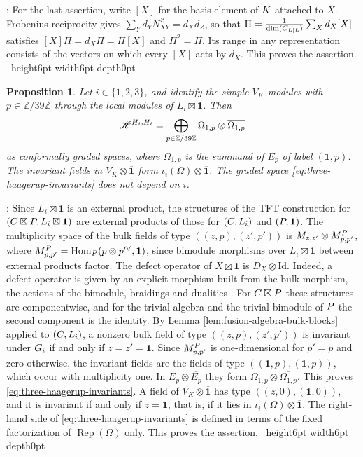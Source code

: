 \documentclass[leqno]{article}
\let\cal\relax
\newcommand{\cal}{\mathcal}
\newcommand{\Z}{\ensuremath{\mathbb{Z}}}
\newcommand{\Id}{\mathrm{Id}}
\newcommand{\qed}{\hfill \vrule height6pt  width6pt depth0pt}
\newcommand{\ot}{\otimes}
\DeclareMathOperator{\Rep}{Rep}
\newtheorem{prop}[thm]{Proposition}
\newenvironment{proof}[1][]{\noindent {\it Proof #1} : }{\hbox{~}\qed
\smallskip
}
\numberwithin{equation}{section}
\begin{document}
\begin{proof}
For the last assertion, write $[X]$ for the basis element of $\cal K$ attached to $X$. Frobenius reciprocity gives $\sum_Yd_YN_{XY}^Z = d_Xd_Z$, so that $\Pi = \frac1{\dim(\cal C_{\cal L|\cal L})}\sum_Xd_X[X]$ satisfies $[X]\Pi = d_X\Pi = \Pi[X]$ and $\Pi^2 = \Pi$. Its range in any representation consists of the vectors on which every $[X]$ acts by $d_X$. This proves the assertion.
\end{proof}

\begin{prop}
\label{prop:three-haagerup-invariant-spectra}
Let $i \in \{1,2,3\}$, and identify the simple $V_K$-modules with $p \in \Z/39\Z$ through the local modules of $L_i\boxtimes\mathbf1$. Then
\begin{equation}
\label{eq:three-haagerup-invariants}
\mathscr H^{\cal H_i,\cal H_i} = \bigoplus_{p \in \Z/39\Z}\Omega_{1,p}\ot\overline{\Omega_{1,p}}
\end{equation}
as conformally graded spaces, where $\Omega_{1,p}$ is the summand of $E_p$ of label $(\mathbf1,p)$. The invariant fields in $V_K\ot\overline{\mathbf1}$ form $\iota_i(\Omega)\ot\overline{\mathbf1}$. The graded space \eqref{eq:three-haagerup-invariants} does not depend on $i$.
\end{prop}

\begin{proof}
Since $L_i\boxtimes\mathbf1$ is an external product, the structures of the TFT construction for $(\cal C\boxtimes\cal P,L_i\boxtimes\mathbf1)$ are external products of those for $(\cal C,L_i)$ and $(\cal P,\mathbf1)$. The multiplicity space of the bulk fields of type $((z,p),(z',p'))$ is $M_{z,z'}\ot M^{\cal P}_{p,p'}$, where $M^{\cal P}_{p,p'} = \operatorname{Hom}_{\cal P}(p\ot p'^\vee,\mathbf1)$, since bimodule morphisms over $L_i\boxtimes\mathbf1$ between external products factor. The defect operator of $X\boxtimes\mathbf1$ is $D_X\ot\Id$. Indeed, a defect operator is given by an explicit morphism built from the bulk morphism, the actions of the bimodule, braidings and dualities \cite[equation (4.14)]{FFRS07}. For $\cal C\boxtimes\cal P$ these structures are componentwise, and for the trivial algebra and the trivial bimodule of $\cal P$ the second component is the identity. By Lemma \ref{lem:fusion-algebra-bulk-blocks} applied to $(\cal C,L_i)$, a nonzero bulk field of type $((z,p),(z',p'))$ is invariant under $\cal G_i$ if and only if $z = z' = \mathbf1$. Since $M^{\cal P}_{p,p'}$ is one-dimensional for $p' = p$ and zero otherwise, the invariant fields are the fields of type $((\mathbf1,p),(\mathbf1,p))$, which occur with multiplicity one. In $E_p\ot\overline{E_p}$ they form $\Omega_{1,p}\ot\overline{\Omega_{1,p}}$. This proves \eqref{eq:three-haagerup-invariants}. A field of $V_K\ot\overline{\mathbf1}$ has type $((z,0),(\mathbf1,0))$, and it is invariant if and only if $z = \mathbf1$, that is, if it lies in $\iota_i(\Omega)\ot\overline{\mathbf1}$. The right-hand side of \eqref{eq:three-haagerup-invariants} is defined in terms of the fixed factorization of $\Rep(\Omega)$ only. This proves the assertion.
\end{proof}
\end{document}
